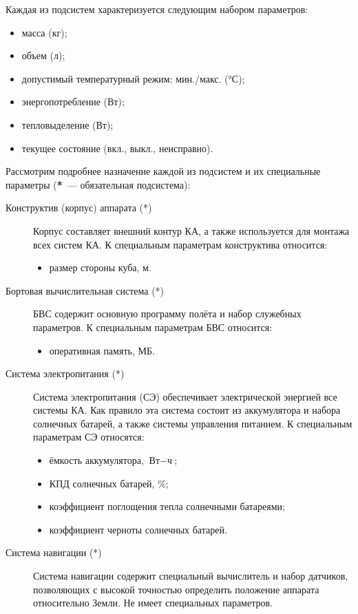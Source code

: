 \documentclass[12pt,a4paper]{article}
\begin{document}
Каждая из подсистем характеризуется следующим набором параметров:

\begin{itemize}
\item масса (кг);
\item объем (л);
\item допустимый температурный режим: мин./макс. (°С);
\item энергопотребление (Вт);
\item тепловыделение (Вт);
\item текущее состояние (вкл., выкл., неисправно).
\end{itemize}

Рассмотрим подробнее назначение каждой из подсистем и их специальные параметры
(\textbf{*}~--- обязательная подсистема):

\begin{description}
\item[Конструктив (корпус) аппарата (*)] Корпус составляет внешний контур КА, а также
  используется для монтажа всех систем КА. К специальным параметрам конструктива
  относится:
  \begin{itemize}
    \item размер стороны куба, м.
  \end{itemize}
\item[Бортовая вычислительная система (*)] БВС содержит основную программу полёта и набор
  служебных параметров. К специальным параметрам БВС относится:
  \begin{itemize}
    \item оперативная память, МБ.
  \end{itemize}
\item [Система электропитания (*)] Система электропитания (СЭ) обеспечивает электрической энергией
  все системы КА. Как правило эта система состоит из аккумулятора и набора солнечных
  батарей, а также системы управления питанием. К специальным параметрам СЭ относятся:
  \begin{itemize}
  \item ёмкость аккумулятора, $\text{Вт} - \text{ч}$;
  \item КПД солнечных батарей, \%;
  \item коэффициент поглощения тепла солнечными батареями;
  \item коэффициент черноты солнечных батарей.
  \end{itemize}

\item [Система навигации (*)] Система навигации содержит специальный вычислитель и набор
  датчиков, позволяющих с высокой точностью определить положение аппарата относительно
  Земли. Не имеет специальных параметров.


\end{description}
\end{document}
